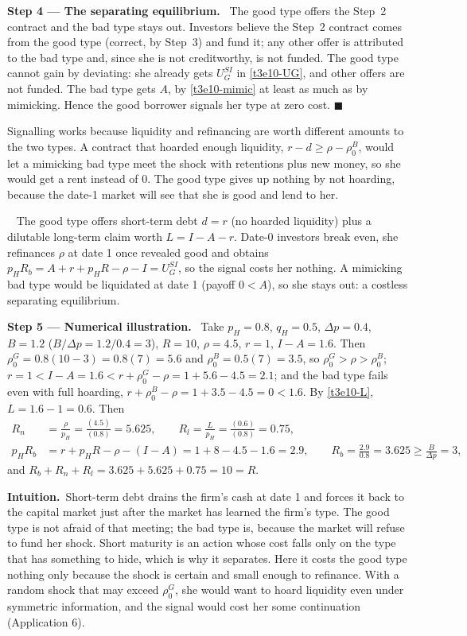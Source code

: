 \documentclass[11pt,a4paper]{article}
\newcommand{\step}[2]{\par\medskip\noindent\textbf{Step #1 --- #2.}~}
\newcommand{\intuition}{\par\medskip\noindent\textbf{Intuition.}~}
\newcommand{\answer}[1]{\par\smallskip\noindent\fbox{\textbf{Answer #1.}}~}
\begin{document}
\step{4}{The separating equilibrium} The good type offers the Step~2 contract and the bad type stays out.
Investors believe the Step~2 contract comes from the good type (correct, by Step~3) and fund it; any other
offer is attributed to the bad type and, since she is not creditworthy, is not funded. The good type
cannot gain by deviating: she already gets $U_G^{SI}$ in \eqref{t3e10-UG}, and other offers are not funded.
The bad type gets $A$, by \eqref{t3e10-mimic} at least as much as by mimicking. Hence the good borrower
signals her type at zero cost. $\blacksquare$

Signalling works because liquidity and refinancing are worth different amounts to the two types. A
contract that hoarded enough liquidity, $r-d\ge\rho-\rho_0^B$, would let a mimicking bad type meet the
shock with retentions plus new money, so she would get a rent instead of 0. The good type gives up
nothing by not hoarding, because the date-1 market will see that she is good and lend to her.

\answer{(a)} The good type offers short-term debt $d=r$ (no hoarded liquidity) plus a dilutable long-term claim worth $L=I-A-r$. Date-0 investors break even, she refinances $\rho$ at date 1 once revealed good and obtains $p_HR_b=A+r+p_HR-\rho-I=U_G^{SI}$, so the signal costs her nothing. A mimicking bad type would be liquidated at date 1 (payoff $0<A$), so she stays out: a costless separating equilibrium.

\step{5}{Numerical illustration} Take $p_H=0.8$, $q_H=0.5$, $\Delta p=0.4$, $B=1.2$ ($B/\Delta p=1.2/0.4=3$),
$R=10$, $\rho=4.5$, $r=1$, $I-A=1.6$. Then $\rho_0^G=0.8(10-3)=0.8(7)=5.6$ and $\rho_0^B=0.5(7)=3.5$, so
$\rho_0^G>\rho>\rho_0^B$; $r=1<I-A=1.6<r+\rho_0^G-\rho=1+5.6-4.5=2.1$; and the bad type fails even with full hoarding,
$r+\rho_0^B-\rho=1+3.5-4.5=0<1.6$. By \eqref{t3e10-L}, $L=1.6-1=0.6$. Then
\begin{align}
  R_n &= \frac{\rho}{p_H} = \frac{(4.5)}{(0.8)} = 5.625, \qquad R_l = \frac{L}{p_H} = \frac{(0.6)}{(0.8)} = 0.75, \nonumber\\
  p_HR_b &= r+p_HR-\rho-(I-A) = 1+8-4.5-1.6 = 2.9, \qquad R_b = \frac{2.9}{0.8} = 3.625\ge\frac{B}{\Delta p}=3, \nonumber
\end{align}
and $R_b+R_n+R_l=3.625+5.625+0.75=10=R$.

\intuition Short-term debt drains the firm's cash at date 1 and forces it back to the capital market just
after the market has learned the firm's type. The good type is not afraid of that meeting; the bad type is,
because the market will refuse to fund her shock. Short maturity is an action whose cost falls only on
the type that has something to hide, which is why it separates. Here it costs the good type nothing only
because the shock is certain and small enough to refinance. With a random shock that may exceed
$\rho_0^G$, she would want to hoard liquidity even under symmetric information, and the signal would cost
her some continuation (Application 6).
\end{document}
